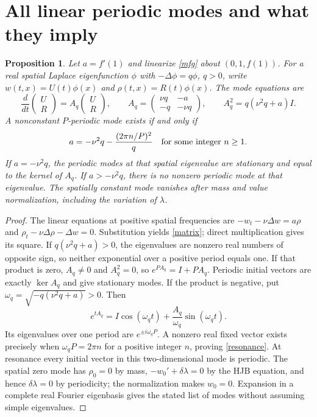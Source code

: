 \documentclass[11pt]{article}
\newtheorem{proposition}[theorem]{Proposition}
\newcommand{\R}{\mathbb R}
\begin{document}
\section{All linear periodic modes and what they imply}
\begin{proposition}\label{spectrum}
Let $a=f'(1)$ and linearize \eqref{mfg} about $(0,1,f(1))$.
For a real spatial Laplace eigenfunction $\phi$ with
$-\Delta\phi=q\phi$, $q>0$, write
$w(t,x)=U(t)\phi(x)$ and $\rho(t,x)=R(t)\phi(x)$.
The mode equations are
\begin{equation}\label{matrix}
 \frac{d}{dt}\begin{pmatrix}U\\R\end{pmatrix}
 =A_q\begin{pmatrix}U\\R\end{pmatrix},\qquad
 A_q=\begin{pmatrix}\nu q&-a\\-q&-\nu q\end{pmatrix},
 \qquad A_q^2=q(\nu^2q+a)I.
\end{equation}
A nonconstant $P$-periodic mode exists if and only if
\begin{equation}\label{resonance}
 a=-\nu^2q-\frac{(2\pi n/P)^2}{q}
 \quad\hbox{for some integer }n\geq1.
\end{equation}
If $a=-\nu^2q$, the periodic modes at that spatial eigenvalue are
stationary and equal to the kernel of $A_q$. If $a> -\nu^2q$, there
is no nonzero periodic mode at that eigenvalue. The spatially constant
mode vanishes after mass and value normalization, including the variation
of $\lambda$.
\end{proposition}
\begin{proof}
The linear equations at positive spatial frequencies are
$-w_t-\nu\Delta w=a\rho$ and
$\rho_t-\nu\Delta\rho-\Delta w=0$. Substitution yields
\eqref{matrix}; direct multiplication gives its square.
If $q(\nu^2q+a)>0$, the eigenvalues are nonzero real numbers of opposite
sign, so neither exponential over a positive period equals one.
If that product is zero, $A_q\ne0$ and $A_q^2=0$, so
$e^{PA_q}=I+PA_q$. Periodic initial vectors are exactly $\ker A_q$
and give stationary modes.
If the product is negative, put
$\omega_q=\sqrt{-q(\nu^2q+a)}>0$. Then
\[
 e^{tA_q}=I\cos(\omega_qt)+\frac{A_q}{\omega_q}\sin(\omega_qt).
\]
Its eigenvalues over one period are $e^{\pm i\omega_qP}$.
A nonzero real fixed vector exists precisely when
$\omega_qP=2\pi n$ for a positive integer $n$, proving
\eqref{resonance}. At resonance every initial vector in this two-dimensional
mode is periodic. The spatial zero mode has $\rho_0=0$ by mass,
$-w_0'+\delta\lambda=0$ by the HJB equation, and hence
$\delta\lambda=0$ by periodicity; the normalization makes $w_0=0$.
Expansion in a complete real Fourier eigenbasis gives the stated list
of modes without assuming simple eigenvalues.
\end{proof}
\end{document}
